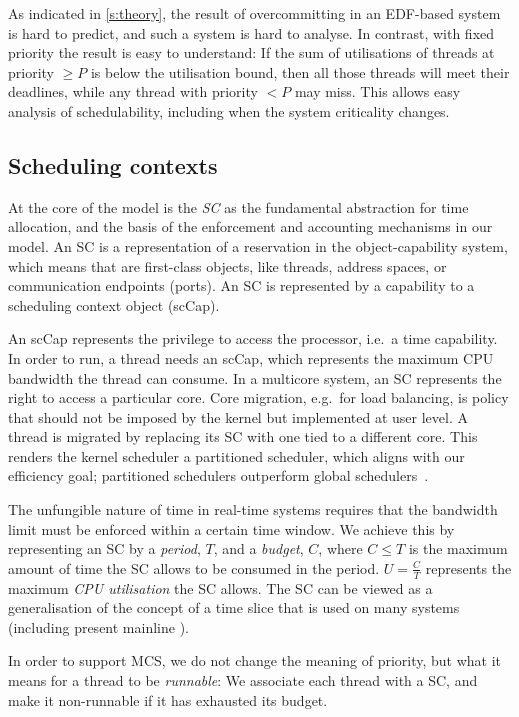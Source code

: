 As indicated in \autoref{s:theory}, the result of overcommitting in an
EDF-based system is hard to predict, and such a system is hard to
analyse. In contrast, with fixed priority the result is easy to
understand: If the sum of utilisations of threads at priority \(\geq
P\) is below the utilisation bound, then all those threads will meet
their deadlines, while any thread with priority \(<P\) may miss. This
allows easy analysis of schedulability, including when the system
criticality changes.

\subsection{Scheduling contexts}
\label{s:scs}

At the core of the model is the \emph{\gls{SC}} as the
fundamental abstraction for time allocation, and the basis of 
the enforcement and accounting mechanisms in our model.
An \gls{SC} is a representation
of a reservation in the object-capability system, which means that 
are first-class objects, like threads, address spaces, or
communication endpoints (ports). An SC is represented by a capability to a
scheduling context object (scCap).

An scCap represents the privilege to access the processor, i.e.\ a
time capability. In order to run, a thread needs an scCap, which represents the
maximum CPU bandwidth the thread can consume.
In a multicore system, an SC represents the right to access a
particular core. Core migration, e.g.\ for load balancing, is policy
that should not be imposed by the kernel but implemented at user
level. A thread is migrated by replacing its SC with one tied to a
different core. This renders the kernel scheduler a partitioned scheduler, 
which aligns with our efficiency goal; partitioned schedulers outperform global
schedulers~\citep{Brandenburg_PHD}.

The unfungible nature of time in real-time systems requires that the
bandwidth limit must be enforced within a certain time window. We
achieve this by representing an SC by a \emph{period}, \(T\), and a
\emph{budget}, \(C\), where \(C\leq T\) is the maximum amount of time
the SC allows to be consumed in the period. \(U=\frac{C}{T}\) represents the
maximum \emph{CPU utilisation} the SC allows. The SC can be viewed as
a generalisation of the concept of a time slice that is used on many
systems (including present mainline \selfour).

In order to support MCS, we do not
change the meaning of priority, but what it means for a thread to be
\emph{runnable}: We associate each thread with a SC, and
make it non-runnable if it has exhausted its budget. 


